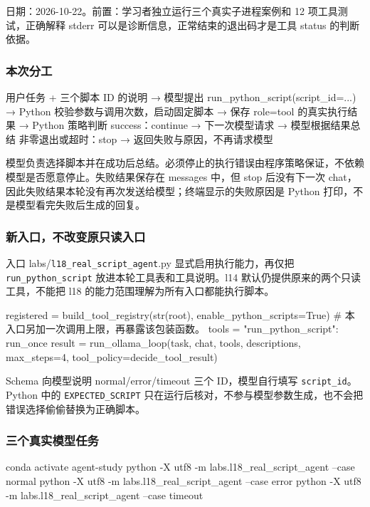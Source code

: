 日期：2026-10-22。前置：学习者独立运行三个真实子进程案例和 12 项工具测试，正确解释 stderr 可以是诊断信息，正常结束的退出码才是工具 status 的判断依据。

\subsubsection{本次分工}

\begin{Code}
用户任务 + 三个脚本 ID 的说明
  → 模型提出 run_python_script(script_id=...)
  → Python 校验参数与调用次数，启动固定脚本
  → 保存 role=tool 的真实执行结果
  → Python 策略判断
      success：continue → 下一次模型请求 → 模型根据结果总结
      非零退出或超时：stop → 返回失败与原因，不再请求模型
\end{Code}

模型负责选择脚本并在成功后总结。必须停止的执行错误由程序策略保证，不依赖模型是否愿意停止。失败结果保存在 messages 中，但 stop 后没有下一次 chat，因此失败结果本轮没有再次发送给模型；终端显示的失败原因是 Python 打印，不是模型看完失败后生成的回复。

\subsubsection{新入口，不改变原只读入口}

入口 labs/\nolinkurl{l18_real_script_agent}.py 显式启用执行能力，再仅把 \nolinkurl{run_python_script} 放进本轮工具表和工具说明。l14 默认仍提供原来的两个只读工具，不能把 l18 的能力范围理解为所有入口都能执行脚本。

\begin{Code}
registered = build_tool_registry(str(root), enable_python_scripts=True)
# 本入口另加一次调用上限，再暴露该包装函数。
tools = {"run_python_script": run_once}
result = run_ollama_loop(task, chat, tools, descriptions,
                         max_steps=4, tool_policy=decide_tool_result)
\end{Code}

Schema 向模型说明 normal/error/timeout 三个 ID，模型自行填写 \nolinkurl{script_id}。Python 中的 \nolinkurl{EXPECTED_SCRIPT} 只在运行后核对，不参与模型参数生成，也不会把错误选择偷偷替换为正确脚本。

\subsubsection{三个真实模型任务}

\begin{Code}
conda activate agent-study
python -X utf8 -m labs.l18_real_script_agent --case normal
python -X utf8 -m labs.l18_real_script_agent --case error
python -X utf8 -m labs.l18_real_script_agent --case timeout
\end{Code}


